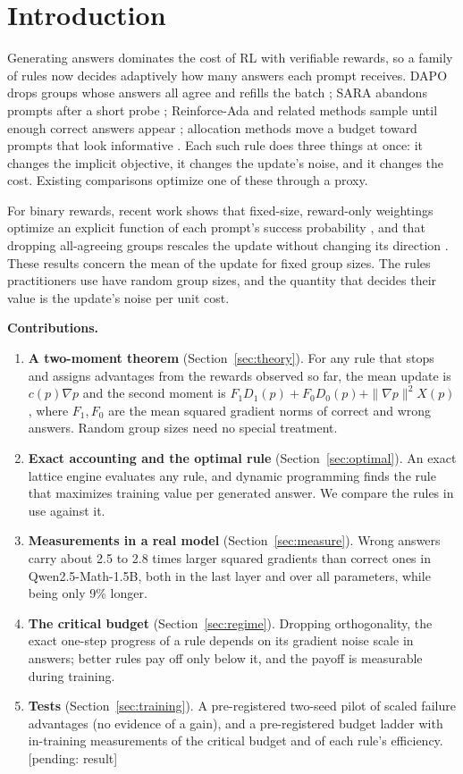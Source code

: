 \documentclass[11pt]{article}
\newcommand{\pending}[1]{\textcolor{red!60!black}{[pending: #1]}}
\begin{document}
\section{Introduction}
Generating answers dominates the cost of RL with verifiable rewards, so a family of rules now decides adaptively how many answers each prompt receives. DAPO drops groups whose answers all agree and refills the batch \citep{yu2025dapo}; SARA abandons prompts after a short probe \citep{sara2026}; Reinforce-Ada and related methods sample until enough correct answers appear \citep{xiong2025reinforceada}; allocation methods move a budget toward prompts that look informative \citep{knapsack2025,yao2025gvm}. Each such rule does three things at once: it changes the implicit objective, it changes the update's noise, and it changes the cost. Existing comparisons optimize one of these through a proxy.

For binary rewards, recent work shows that fixed-size, reward-only weightings optimize an explicit function of each prompt's success probability \citep{davis2025objective,mroueh2025grpo,thrampoulidis2025shaping}, and that dropping all-agreeing groups rescales the update without changing its direction \citep{okonkwo2026arcus}. These results concern the mean of the update for fixed group sizes. The rules practitioners use have random group sizes, and the quantity that decides their value is the update's noise per unit cost.

\textbf{Contributions.}
\begin{enumerate}[leftmargin=*,itemsep=2pt,topsep=2pt]
\item \textbf{A two-moment theorem} (Section~\ref{sec:theory}). For any rule that stops and assigns advantages from the rewards observed so far, the mean update is $c(p)\nabla p$ and the second moment is $F_1D_1(p)+F_0D_0(p)+\|\nabla p\|^2X(p)$, where $F_1,F_0$ are the mean squared gradient norms of correct and wrong answers. Random group sizes need no special treatment.
\item \textbf{Exact accounting and the optimal rule} (Section~\ref{sec:optimal}). An exact lattice engine evaluates any rule, and dynamic programming finds the rule that maximizes training value per generated answer. We compare the rules in use against it.
\item \textbf{Measurements in a real model} (Section~\ref{sec:measure}). Wrong answers carry about 2.5 to 2.8 times larger squared gradients than correct ones in Qwen2.5-Math-1.5B, both in the last layer and over all parameters, while being only 9\% longer.
\item \textbf{The critical budget} (Section~\ref{sec:regime}). Dropping orthogonality, the exact one-step progress of a rule depends on its gradient noise scale in answers; better rules pay off only below it, and the payoff is measurable during training.
\item \textbf{Tests} (Section~\ref{sec:training}). A pre-registered two-seed pilot of scaled failure advantages (no evidence of a gain), and a pre-registered budget ladder with in-training measurements of the critical budget and of each rule's efficiency. \pending{result}
\end{enumerate}
\end{document}
